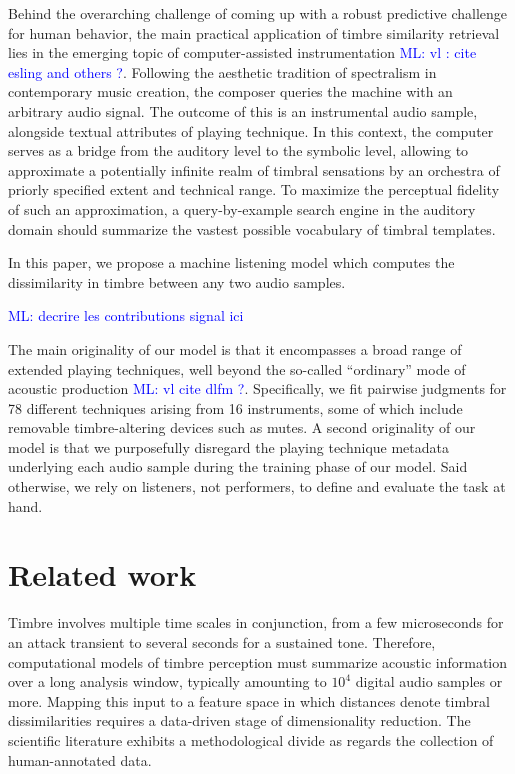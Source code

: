 \documentclass{bmcart}
\newcommand{\ml}[1]{\textcolor{blue}{ML: #1}}
\begin{document}
Behind the overarching challenge of coming up with a robust predictive challenge for human behavior, the main practical application of timbre similarity retrieval lies in the emerging topic of computer-assisted instrumentation \ml{vl : cite esling and others ?}.
Following the aesthetic tradition of spectralism in contemporary music creation, the composer queries the machine with an arbitrary audio signal.
The outcome of this is an instrumental audio sample, alongside textual attributes of playing technique.
In this context, the computer serves as a bridge from the auditory level to the symbolic level, allowing to approximate a potentially infinite realm of timbral sensations by an orchestra of priorly specified extent and technical range.
To maximize the perceptual fidelity of such an approximation, a query-by-example search engine in the auditory domain should summarize the vastest possible vocabulary of timbral templates.

In this paper, we propose a machine listening model which computes the dissimilarity in timbre between any two audio samples.

\ml{decrire les contributions signal ici}

The main originality of our model is that it encompasses a broad range of extended playing techniques, well beyond the so-called ``ordinary'' mode of acoustic production \ml{vl cite dlfm ?}.
Specifically, we fit pairwise judgments for 78 different techniques arising from 16 instruments, some of which include removable timbre-altering devices such as mutes.
A second originality of our model is that we purposefully disregard the playing technique metadata underlying each audio sample during the training phase of our model.
Said otherwise, we rely on listeners, not performers, to define and evaluate the task at hand.




\section*{Related work}
Timbre involves multiple time scales in conjunction, from a few microseconds for an attack transient to several seconds for a sustained tone.
Therefore, computational models of timbre perception must summarize acoustic information over a long analysis window, typically amounting to $10^{4}$ digital audio samples or more.
Mapping this input to a feature space in which distances denote timbral dissimilarities requires a data-driven stage of dimensionality reduction.
The scientific literature exhibits a methodological divide as regards the collection of human-annotated data.
\end{document}
